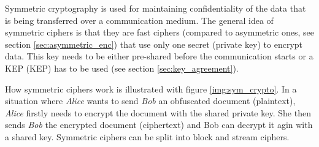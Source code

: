 Symmetric cryptography is used for maintaining confidentiality of the data that is being transferred over a communication medium. The general idea of symmetric ciphers is that they are fast ciphers (compared to asymmetric ones, see section \ref{sec:asymmetric_enc}) that use only one secret (private key) to encrypt data. This key needs to be either pre-shared before the communication starts or a KEP ({\acl{KEP}}) has to be used (see section \ref{sec:key_agreement}). \cite{Ristic2014}

How symmetric ciphers work is illustrated with figure \ref{img:sym_crypto}. In a situation where \textit{Alice} wants to send \textit{Bob} an obfuscated document (plaintext), \textit{Alice} firstly needs to encrypt the document with the shared private key. She then sends \textit{Bob} the encrypted document (ciphertext) and Bob can decrypt it agin with a shared key. Symmetric ciphers can be split into block and stream ciphers.



